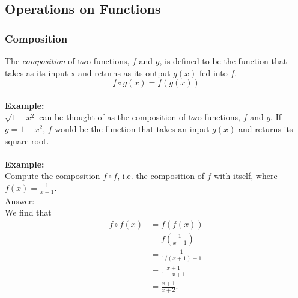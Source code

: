 \documentclass[twoside,openright,titlepage,a4paper]{book}
\begin{document}
\begin{sloppypar}
\subsection{Operations on Functions} \label{ChFunctionsSubsOperationsOnFunctions}

\subsubsection{Composition}

The \textit{composition} of two functions, $f$ and $g$, is defined to be the function that takes as its input x and returns as its output $g(x)$ fed into $f$.
\begin{equation*} f\circ g(x)=f(g(x)) \end{equation*}
\\
\textbf{Example:}\\
${\sqrt{1-x^{2}}}$ can be thought of as the composition of two functions, $f$ and $g$. If ${g=1-x^{2}}$, $f$ would be the function that takes an input $g(x)$ and returns its square root.\\\\
\textbf{Example:}\\
Compute the composition ${f \circ f}$, i.e. the composition of $f$ with itself, where ${\displaystyle f(x) = \frac{1}{x+1}}$.\\
Answer:\\
We find that
\begin{align*}
f \circ f(x)&=f(f(x))\\
&=f \left(\frac{1}{x+1}\right)\\
&=\frac{1}{1/\left(x+1\right)+1}\\
&=\frac{x+1}{1+x+1}\\
&=\frac{x+1}{x+2}.
\end{align*}


\end{sloppypar}
\end{document}
